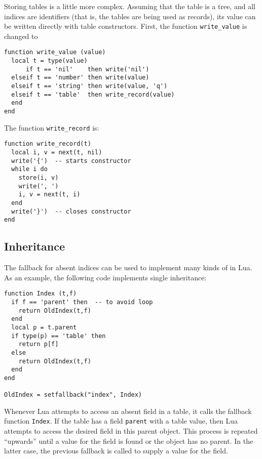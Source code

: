 Storing tables is a little more complex.
Assuming that the table is a tree,
and all indices are identifiers
(that is, the tables are being used as records),
its value can be written directly with table constructors.
First, the function \verb'write_value' is changed to
\begin{verbatim}
function write_value (value)
  local t = type(value)
      if t == 'nil'    then write('nil')
  elseif t == 'number' then write(value)
  elseif t == 'string' then write(value, 'q')
  elseif t == 'table'  then write_record(value)
  end
end
\end{verbatim}
The function \verb'write_record' is:
\begin{verbatim}
function write_record(t)
  local i, v = next(t, nil)
  write('{')  -- starts constructor
  while i do
    store(i, v)
    write(', ')
    i, v = next(t, i)
  end
  write('}')  -- closes constructor
end
\end{verbatim}


\subsection{Inheritance} \label{exfallback}
The fallback for absent indices can be used to implement many
kinds of  in Lua.
As an example,
the following code implements single inheritance:
\begin{verbatim}
function Index (t,f)
  if f == 'parent' then  -- to avoid loop
    return OldIndex(t,f)
  end
  local p = t.parent
  if type(p) == 'table' then
    return p[f]
  else
    return OldIndex(t,f)
  end
end

OldIndex = setfallback("index", Index)
\end{verbatim}
Whenever Lua attempts to access an absent field in a table,
it calls the fallback function \verb'Index'.
If the table has a field \verb'parent' with a table value,
then Lua attempts to access the desired field in this parent object.
This process is repeated ``upwards'' until a value
for the field is found or the object has no parent.
In the latter case, the previous fallback is called to supply a value
for the field.

